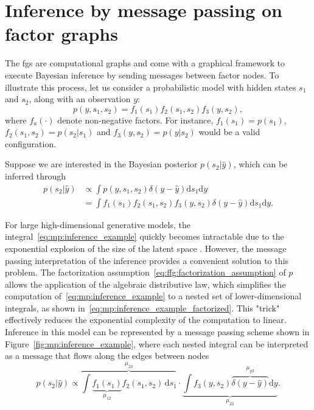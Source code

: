 
\section{Inference by message passing on factor graphs}\label{chapter-02:section:message-passing}

The \acp{fg} are computational graphs and come with a graphical framework to execute Bayesian inference by sending messages between factor nodes.
To illustrate this process, let us consider a probabilistic model with hidden states $s_1$ and
$s_2$, along with an observation $y$: \begin{equation}
    p(y, s_1, s_2) = f_1(s_1)f_2(s_1, s_2)f_3(y, s_2),
  \end{equation} 
where $f_a(\cdot)$ denote non-negative factors. For instance, $f_1(s_1) = p(s_1)$, $f_2(s_1,s_2)=p(s_2|s_1)$ and $f_3(y, s_2)=p(y|s_2)$ would be a valid configuration.  

Suppose we are interested in the Bayesian posterior $p(s_2\vert \hat{y})$, which can be inferred through
\begin{equation}\label{eq:mp:inference_example} 
  \begin{aligned}
    p(s_2|\hat{y}) &\propto \int p(y, s_1,s_2) \delta(y-\hat{y}) \mathrm{d}s_1 \mathrm{d}y \\
    &= \int f_1(s_1)f_2(s_1, s_2)f_3(y, s_2)\delta(y-\hat{y}) \mathrm{d}s_1 \mathrm{d}y.
    \end{aligned}
\end{equation}

For large high-dimensional
generative models, the integral~\eqref{eq:mp:inference_example} quickly becomes intractable
due to the exponential explosion of the size of the latent space \citep{bishop_pattern_2006}.
However, the message passing interpretation of the inference provides a convenient solution to
this problem.
The factorization assumption~\eqref{eq:ffg:factorization_assumption} of $p$ allows the
application of the algebraic distributive law, which simplifies the computation
of~\eqref{eq:mp:inference_example} to a nested set of lower-dimensional integrals, as shown
in~\eqref{eq:mp:inference_example_factorized}.
This "trick" effectively reduces the exponential complexity of the computation to linear.
Inference in this model can be represented by a message passing scheme shown in
Figure~\ref{fig:mp:inference_example}, where each nested integral can be interpreted as a
message that flows along the edges between nodes
\begin{equation}
  \label{eq:mp:inference_example_factorized}
  p(s_2|\hat{y}) \propto \overbrace{\int \underbrace{f_1(s_1)}_{\mu_{12}}f_2(s_1, s_2) \,\mathrm{d}s_1}^{\mu_{23}} \cdot \underbrace{\int f_3(y, s_2)\overbrace{\delta(y - \hat{y})}^{\mu_{y3}}\mathrm{d}y }_{\mu_{22}}.
\end{equation}

